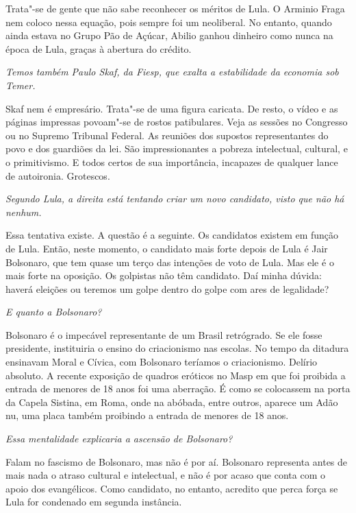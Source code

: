 \normalfont 
Trata"-se de gente que não sabe reconhecer os méritos de
Lula. O Arminio Fraga nem coloco nessa equação, pois sempre foi um
neoliberal. No entanto, quando ainda estava no Grupo Pão de Açúcar,
Abilio ganhou dinheiro como nunca na época de Lula, graças à abertura do
crédito.

\itshape
 Temos também Paulo Skaf, da Fiesp, que exalta a
estabilidade da economia sob Temer.

\normalfont 
Skaf nem é empresário. Trata"-se de uma figura caricata.
De resto, o vídeo e as páginas impressas povoam"-se de rostos
patibulares. Veja as sessões no Congresso ou no Supremo Tribunal
Federal. As reuniões dos supostos representantes do povo e dos guardiões
da lei. São impressionantes a pobreza intelectual, cultural, e o
primitivismo. E todos certos de sua importância, incapazes de qualquer
lance de autoironia. Grotescos.

\itshape
 Segundo Lula, a direita está tentando criar um novo
candidato, visto que não há nenhum.

\normalfont 
Essa tentativa existe. A questão é a seguinte. Os
candidatos existem em função de Lula. Então, neste momento, o candidato
mais forte depois de Lula é Jair Bolsonaro, que tem quase um terço das
intenções de voto de Lula. Mas ele é o mais forte na oposição. Os
golpistas não têm candidato. Daí minha dúvida: haverá eleições ou
teremos um golpe dentro do golpe com ares de legalidade?

\itshape
 E quanto a Bolsonaro?

\normalfont 
Bolsonaro é o impecável representante de um Brasil
retrógrado. Se ele fosse presidente, instituiria o ensino do
criacionismo nas escolas. No tempo da ditadura ensinavam Moral e Cívica,
com Bolsonaro teríamos o criacionismo. Delírio absoluto. A recente
exposição de quadros eróticos no Masp em que foi proibida a entrada de
menores de 18 anos foi uma aberração. É como se colocassem na porta da
Capela Sistina, em Roma, onde na abóbada, entre outros, aparece um Adão
nu, uma placa também proibindo a entrada de menores de 18 anos.

\itshape
 Essa mentalidade explicaria a ascensão de Bolsonaro?

\normalfont 
Falam no fascismo de Bolsonaro, mas não é por aí.
Bolsonaro representa antes de mais nada o atraso cultural e intelectual,
e não é por acaso que conta com o apoio dos evangélicos. Como candidato,
no entanto, acredito que perca força se Lula for condenado em segunda
instância.

